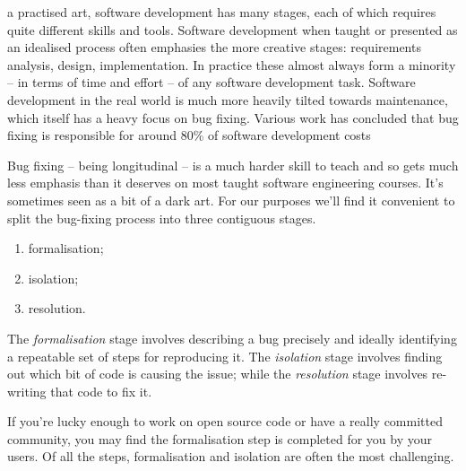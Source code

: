 \documentclass[10pt,journal,compsoc]{IEEEtran}
\begin{document}
% 
% 
% 
% 
 a practised art, software development has many stages, each of which requires quite different skills and tools. Software development when taught or presented as an idealised process often emphasies the more creative stages: requirements analysis, design, implementation. In practice these almost always form a minority -- in terms of time and effort -- of any software development task. Software development in the real world is much more heavily tilted towards maintenance, which itself has a heavy focus on bug fixing. Various work has concluded that bug fixing is responsible for around 80\% of software development costs \cite{nist2002}

Bug fixing -- being longitudinal -- is a much harder skill to teach and so gets much less emphasis than it deserves on most taught software engineering courses. It's sometimes seen as a bit of a dark art. For our purposes we'll find it convenient to split the bug-fixing process into three contiguous stages.

\begin{enumerate}
\item formalisation;
\item isolation;
\item resolution.
\end{enumerate}

The {\it formalisation\/} stage involves describing a bug precisely and ideally identifying a repeatable set of steps for reproducing it. The {\it isolation\/} stage involves finding out which bit of code is causing the issue; while the {\it resolution\/} stage involves re-writing that code to fix it.

If you're lucky enough to work on open source code or have a really committed community, you may find the formalisation step is completed for you by your users. Of all the steps, formalisation and isolation are often the most challenging.
\end{document}
